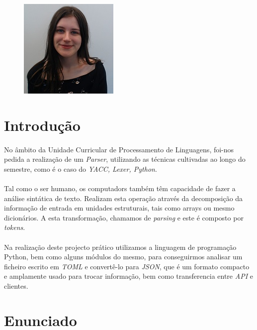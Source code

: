 \documentclass[a4paper]{report}
\begin{document}
\begin{minipage}{0.9\linewidth}
\begin{center}
\begin{figure}[H]
            \includegraphics[width=0.31\linewidth]{imagens/Aluno3.jpg}
        \end{figure}
    \end{center}
\end{minipage}


\renewcommand{\contentsname}{Índice}
\tableofcontents

\newpage


\section{Introdução}
\paragraph{}
No âmbito da Unidade Curricular de Processamento de Linguagens, foi-nos pedida a realização de um \textit{Parser}, utilizando as técnicas cultivadas ao longo do semestre, como é o caso do \textit{YACC, Lexer, Python}.
\paragraph{}
Tal como o ser humano, os computadors também têm capacidade de fazer a análise sintática de texto. Realizam esta operação através da decomposição da informação de entrada em unidades estruturais, tais como arrays ou mesmo dicionários. A esta transformação, chamamos de \textit{parsing} e este é composto por \textit{tokens}. 
\paragraph{}
Na realização deste projecto prático utilizamos a linguagem de programação Python, bem como alguns módulos do mesmo, para conseguirmos analisar um ficheiro escrito em \textit{TOML} e convertê-lo para \textit{JSON}, que é um formato compacto e amplamente usado para trocar informação, bem como transferencia entre \textit{API} e clientes.
\newpage

\section{Enunciado}
\end{document}
